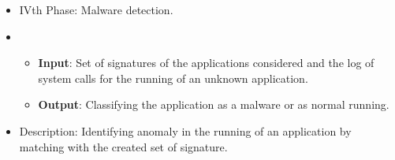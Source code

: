 \begin{itemize}
    \item[] IVth Phase: Malware detection.
    \item[] \begin{itemize}
                \item[] \textbf{Input}: Set of signatures of the applications considered and the log of system calls for the running of an unknown application.
                \item[] \textbf{Output}: Classifying the application as a malware or as normal running.
            \end{itemize}
    \item[] Description: Identifying anomaly in the running of an application by matching with the created set of signature.
\end{itemize}

